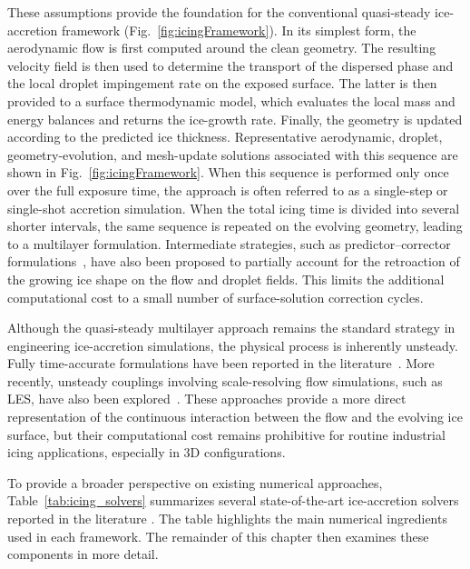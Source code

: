 These assumptions provide the foundation for the conventional quasi-steady ice-accretion framework (Fig.~\ref{fig:icingFramework}). In its simplest form, the aerodynamic flow is first computed around the clean geometry. The resulting velocity field is then used to determine the transport of the dispersed phase and the local droplet impingement rate on the exposed surface. The latter is then provided to a surface thermodynamic model, which evaluates the local mass and energy balances and returns the ice-growth rate. Finally, the geometry is updated according to the predicted ice thickness. Representative aerodynamic, droplet, geometry-evolution, and mesh-update solutions associated with this sequence are shown in Fig.~\ref{fig:icingFramework}. When this sequence is performed only once over the full exposure time, the approach is often referred to as a single-step or single-shot accretion simulation. When the total icing time is divided into several shorter intervals, the same sequence is repeated on the evolving geometry, leading to a multilayer formulation. Intermediate strategies, such as predictor--corrector formulations~\cite{radenac2024workflow, maximeBlanchetDynamicThermo}, have also been proposed to partially account for the retroaction of the growing ice shape on the flow and droplet fields. This limits the additional computational cost to a small number of surface-solution correction cycles.

Although the quasi-steady multilayer approach remains the standard strategy in engineering ice-accretion simulations, the physical process is inherently unsteady. Fully time-accurate formulations have been reported in the literature~\cite{unsteadyHabashi}. More recently, unsteady couplings involving scale-resolving flow simulations, such as LES, have also been explored~\cite{zabaletamultishot}. These approaches provide a more direct representation of the continuous interaction between the flow and the evolving ice surface, but their computational cost remains prohibitive for routine industrial icing applications, especially in 3D configurations.

To provide a broader perspective on existing numerical approaches, Table~\ref{tab:icing_solvers} summarizes several state-of-the-art ice-accretion solvers reported in the literature \cite{laurendeau2022summary,laurendeau2024summary}. The table highlights the main numerical ingredients used in each framework. The remainder of this chapter then examines these components in more detail.



